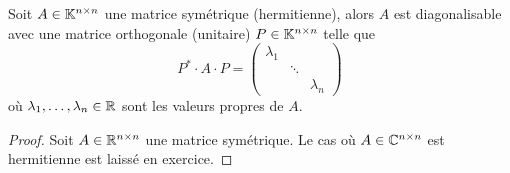\begin{theorem}
\label{thr:16}
  Soit $A \in \mathbb{K}^{n\times n}$ une matrice symétrique (hermitienne), alors $A$ est diagonalisable avec une matrice orthogonale (unitaire) $P \in \mathbb{K}^{n \times n}$ telle que 
  \begin{equation}
    \label{diagonal}
    P^* \cdot A \cdot P =
    \begin{pmatrix}
      \lambda_1 \\
      & \ddots \\
      && \lambda_n
    \end{pmatrix}
  \end{equation}
  où $\lambda_1,\dots,\lambda_n \in \mathbb{R}$ sont les valeurs propres de $A$. 
\end{theorem}


\begin{proof}
  Soit $A \in \mathbb{R}^{n\times n}$
  une matrice symétrique. Le cas où $A \in \mathbb{C}^{n \times n}$
  est hermitienne est laissé en exercice.


\end{proof}
